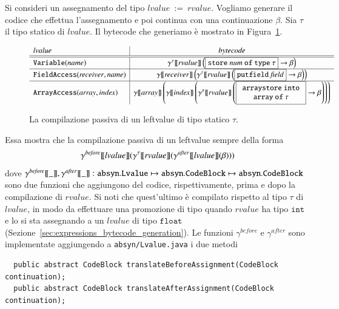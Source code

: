 Si consideri un assegnamento del tipo
$\mathtt{\mathit{lvalue}\ :=\ \mathit{rvalue}}$. Vogliamo generare il codice
che effettua l'assegnamento e poi continua con una continuazione $\beta$.
Sia $\tau$ il tipo statico di $\mathit{lvalue}$. Il bytecode che
generiamo \`e mostrato in Figura~\ref{fig:passive_leftvalues}.
%
\begin{figure}[t]
\[
  \begin{array}{l|c}
    \mathit{lvalue} & \mathit{bytecode} \\\hline\hline
    \mathtt{Variable(\mathit{name})} &
      \gentwo{\tau}{\mathit{rvalue}}\left(\fbox{$\mathtt{store}\ \mathit{num}\ \mathtt{of\ type\ }\tau$}\to\beta\right)\\\hline
    \mathtt{FieldAccess(\mathit{receiver},\mathit{name})} &
      \gen{\mathit{receiver}}\left(
      \gentwo{\tau}{\mathit{rvalue}}\left(\fbox{$\mathtt{putfield}\ \mathit{field}$}\to\beta\right)\right)\\\hline
    \mathtt{ArrayAccess(\mathit{array},\mathit{index})} &
      \gen{\mathit{array}}\left(\gen{\mathit{index}}\left(
      \gentwo{\tau}{\mathit{rvalue}}\left(\fbox{$\begin{array}{c}
      \mathtt{arraystore\ into}\\
      \mathtt{array\ of}\ \tau
      \end{array}$}\to\beta\right)\right)\right)
  \end{array}
\]
\caption{La compilazione passiva di un leftvalue di tipo statico $\tau$.}
  \label{fig:passive_leftvalues}
\end{figure}
%
Essa mostra che la compilazione passiva di un leftvalue \e sempre della forma
\[
  \gamma^\mathit{before}{[\![{\mathit{lvalue}}]\!]}
    ({\gamma^{{\tau}}[\![{\mathit{rvalue}}]\!]}
    (\gamma^\mathit{after}{[\![{\mathit{lvalue}}]\!]}(\beta)))
\]
dove $\gamma^\mathit{before}{[\![{\_}]\!]},\gamma^\mathit{after}{[\![{\_}]\!]}:
\mathtt{absyn.Lvalue}\mapsto
\mathtt{absyn.CodeBlock}\mapsto\mathtt{absyn.CodeBlock}$
sono due funzioni che aggiungono del codice, rispettivamente, prima e dopo
la compilazione di $\mathit{rvalue}$. Si noti che quest'ultimo \`e compilato
rispetto al tipo $\tau$ di $\mathit{lvalue}$, in modo da effettuare una
promozione di tipo quando $\mathit{rvalue}$ ha tipo $\mathtt{int}$ e
lo si sta assegnando a un $\mathit{lvalue}$ di tipo $\mathtt{float}$
(Sezione~\ref{sec:expressions_bytecode_generation}).
Le funzioni $\gamma^\mathit{before}$ e
$\gamma^\mathit{after}$ sono implementate aggiungendo
a \texttt{absyn/Lvalue.java} i due metodi
%
{\small
\begin{verbatim}
  public abstract CodeBlock translateBeforeAssignment(CodeBlock continuation);
  public abstract CodeBlock translateAfterAssignment(CodeBlock continuation);
\end{verbatim}}
